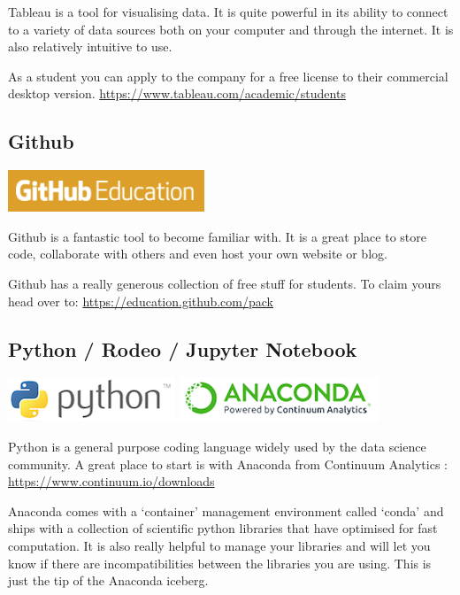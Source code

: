 \documentclass[]{book}
\theoremstyle{definition}
\theoremstyle{definition}
\theoremstyle{remark}
\begin{document}
Tableau is a tool for visualising data. It is quite powerful in its
ability to connect to a variety of data sources both on your computer
and through the internet. It is also relatively intuitive to use.

As a student you can apply to the company for a free license to their
commercial desktop version.
\url{https://www.tableau.com/academic/students}

\subsection{Github}\label{github}

\includegraphics[width=0.3\linewidth]{images/GithubEdulogo}

Github is a fantastic tool to become familiar with. It is a great place
to store code, collaborate with others and even host your own website or
blog.

Github has a really generous collection of free stuff for students. To
claim yours head over to: \url{https://education.github.com/pack}

\subsection{Python / Rodeo / Jupyter
Notebook}\label{python-rodeo-jupyter-notebook}

\includegraphics{images/Pythonlogo.png}
\includegraphics{images/Anacondalogo.png}

Python is a general purpose coding language widely used by the data
science community. A great place to start is with Anaconda from
Continuum Analytics : \url{https://www.continuum.io/downloads}

Anaconda comes with a `container' management environment called `conda'
and ships with a collection of scientific python libraries that have
optimised for fast computation. It is also really helpful to manage your
libraries and will let you know if there are incompatibilities between
the libraries you are using. This is just the tip of the Anaconda
iceberg.
\end{document}
